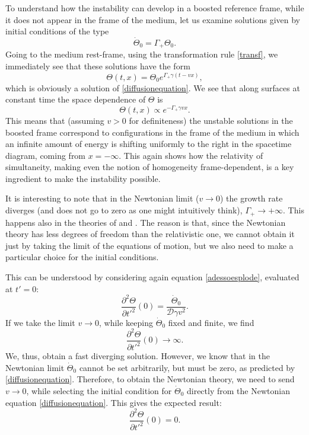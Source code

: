 \documentclass[a4paper, amsfonts, amssymb, amsmath, reprint, showkeys, nofootinbib, twoside]{revtex4-1}
\begin{document}
To understand how the instability can develop in a boosted reference frame, while it does not appear in the frame of the medium, let us examine solutions given by initial conditions of the type
\begin{equation}
\dot{\Theta}_0 = \Gamma_+ \Theta_0.
\end{equation} 
Going to the medium rest-frame, using the transformation rule \eqref{transf}, we immediately see that these solutions have the form
\begin{equation}
\Theta (t,x) = \Theta_0 e^{\Gamma_+ \gamma (t-vx)},
\end{equation}
which is obviously a solution of \eqref{diffusionequation}. We see that along surfaces at constant time the space dependence of $\Theta$ is 
\begin{equation}
\Theta (t,x) \propto e^{-\Gamma_+ \gamma v x}.
\end{equation}
This means that (assuming $v>0$ for definiteness) the unstable solutions in the boosted frame correspond to configurations in the frame of the medium in which an infinite amount of energy is shifting uniformly to the right in the spacetime diagram, coming from $x =-\infty $. This again shows how the relativity of simultaneity, making even the notion of homogeneity frame-dependent, is a key ingredient to make the instability possible.

It is interesting to note that in the Newtonian limit ($v \longrightarrow 0$) the growth rate diverges (and does not go to zero as one might intuitively think), $\Gamma_+ \longrightarrow +\infty$. 
This happens also in the theories of \cite{Eckart1940} and \cite{landau6}. The reason is that, since the Newtonian theory has less degrees of freedom than the relativistic one, we cannot obtain it just by taking the limit of the equations of motion, but we also need to make a particular choice for the initial conditions. 

This can be understood by considering again equation \eqref{adessoesplode}, evaluated at $t'=0$:
\begin{equation}
\dfrac{\partial^2 \Theta}{\partial {t'}^2} (0) = \dfrac{ \dot{\Theta}_0}{\mathcal{D} \gamma v^2}.
\end{equation}
If we take the limit $v \longrightarrow 0$, while keeping $ \dot{\Theta}_0$ fixed and finite, we find
\begin{equation}
\dfrac{\partial^2 \Theta}{\partial {t'}^2} (0) \longrightarrow \infty.
\end{equation}
We, thus, obtain a fast diverging solution. However, we know that in the Newtonian limit $ \dot{\Theta}_0$ cannot be set arbitrarily, but must be zero, as predicted by \eqref{diffusionequation}. Therefore, to obtain the Newtonian theory, we need to send $v \longrightarrow 0$, while selecting the initial condition for $\dot{\Theta}_0$ directly from the Newtonian equation \eqref{diffusionequation}. This gives the expected result:
\begin{equation}
\dfrac{\partial^2 \Theta}{\partial {t'}^2} (0) =0.
\end{equation}
\end{document}

